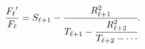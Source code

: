 \[\frac{\mathop{F_{\ell}\/}\nolimits'}{\mathop{F_{\ell}\/}\nolimits}=S_{\ell+1}-%
\cfrac{R_{\ell+1}^{2}}{T_{\ell+1}-\cfrac{R_{\ell+2}^{2}}{T_{\ell+2}-\cdots}}.\]
